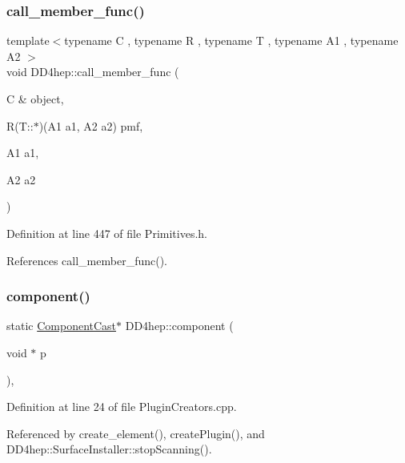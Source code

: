 \subsubsection{\texorpdfstring{call\+\_\+member\+\_\+func()}{call\_member\_func()}\hspace{0.1cm}{\footnotesize\ttfamily [3/3]}}
{\footnotesize\ttfamily template$<$typename C , typename R , typename T , typename A1 , typename A2 $>$ \\
void D\+D4hep\+::call\+\_\+member\+\_\+func (\begin{DoxyParamCaption}\item[{C \&}]{object,  }\item[{R(T\+::$\ast$)(A1 a1, A2 a2)}]{pmf,  }\item[{A1}]{a1,  }\item[{A2}]{a2 }\end{DoxyParamCaption})}



Definition at line 447 of file Primitives.\+h.



References call\+\_\+member\+\_\+func().

\hypertarget{namespace_d_d4hep_a9bd7c6fd6580a172a3d0a09eb3ea4793}{}\label{namespace_d_d4hep_a9bd7c6fd6580a172a3d0a09eb3ea4793} 
\subsubsection{\texorpdfstring{component()}{component()}}
{\footnotesize\ttfamily static \hyperlink{class_d_d4hep_1_1_component_cast}{Component\+Cast}$\ast$ D\+D4hep\+::component (\begin{DoxyParamCaption}\item[{void $\ast$}]{p }\end{DoxyParamCaption})\hspace{0.3cm}{\ttfamily [inline]}, {\ttfamily [static]}}



Definition at line 24 of file Plugin\+Creators.\+cpp.



Referenced by create\+\_\+element(), create\+Plugin(), and D\+D4hep\+::\+Surface\+Installer\+::stop\+Scanning().

\hypertarget{namespace_d_d4hep_a75e45fd87352ce6cd4a2643db432e165}{}\label{namespace_d_d4hep_a75e45fd87352ce6cd4a2643db432e165} 
